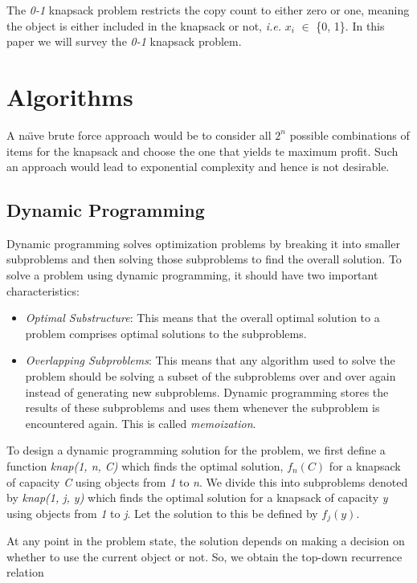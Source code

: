 \documentclass{article}
\begin{document}
The \textit{0-1} knapsack problem restricts the copy count to either zero or one, meaning the object is either included in the knapsack or not, \textit{i.e.} \textit{$x_{i}$} $\in$ \{0, 1\}. In this paper we will survey the \textit{0-1} knapsack problem.

\section{Algorithms}
A na\"{\i}ve brute force approach would be to consider all $2^{n}$ possible combinations of items for the knapsack and choose the one that yields te maximum profit. Such an approach would lead to exponential complexity and hence is not desirable.
\subsection{Dynamic Programming}
Dynamic programming solves optimization problems by breaking it into smaller subproblems and then solving those subproblems to find the overall solution. To solve a problem using dynamic programming, it should have two important characteristics:
\begin{itemize}
	\item \textit{Optimal Substructure}: This means that the overall optimal solution to a problem comprises optimal solutions to the subproblems.
	\item \textit{Overlapping Subproblems}: This means that any algorithm used to solve the problem should be solving a subset of the subproblems over and over again instead of generating new subproblems. Dynamic programming stores the results of these subproblems and uses them whenever the subproblem is encountered again. This is called \textit{memoization}.
\end{itemize}
 
To design a dynamic programming solution for the problem, we first define a function \textit{knap(1, n, C)} which finds the optimal solution, $f_{n}(C)$ for a knapsack of capacity \textit{C} using objects from \textit{1} to \textit{n}. We divide this into subproblems denoted by \textit{knap(1, j, y)} which finds the optimal solution for a knapsack of capacity \textit{y} using objects from \textit{1} to \textit{j}. Let the solution to this be defined by $f_{j}(y)$.

At any point in the problem state, the solution depends on making a decision on whether to use the current object or not. So, we obtain the top-down recurrence relation
\end{document}
